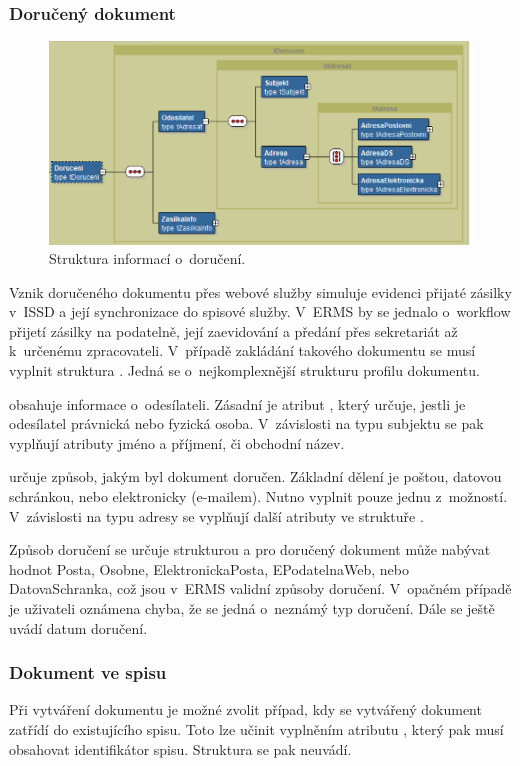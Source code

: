 \documentclass[
  master,
  field=ainfp,
  biblatex,
  language=czech,
  glossaries,
  theorems=false,
  index
]{kidiplom}
\begin{document}
\subsubsection{Doručený dokument}  
\begin{figure}[h]
  \centerline{\includegraphics[width=0.9\linewidth]{./images/Doruceni.png}} 
  \caption{Struktura informací o~doručení.} 
\end{figure}            
Vznik doručeného dokumentu přes webové služby simuluje evidenci přijaté zásilky v~ISSD a její synchronizace do spisové služby. V~ERMS by se jednalo o~workflow přijetí zásilky na podatelně, její zaevidování a předání přes sekretariát až k~určenému zpracovateli. V~případě zakládání takového dokumentu se musí vyplnit struktura . Jedná se o~nejkomplexnější strukturu profilu dokumentu.

 obsahuje informace o~odesílateli. Zásadní je atribut , který určuje, jestli je odesílatel právnická nebo fyzická osoba. V~závislosti na typu subjektu se pak vyplňují atributy jméno a příjmení, či obchodní název.

 určuje způsob, jakým byl dokument doručen. Základní dělení je poštou, datovou schránkou, nebo elektronicky (e-mailem). Nutno vyplnit pouze jednu z~možností. V~závislosti na typu adresy se vyplňují další atributy ve struktuře .

Způsob doručení se určuje strukturou  a pro doručený dokument může nabývat hodnot Posta, Osobne, ElektronickaPosta, EPodatelnaWeb, nebo DatovaSchranka, což jsou v~ERMS validní způsoby doručení. V~opačném případě je uživateli oznámena chyba, že se jedná o~neznámý typ doručení. Dále se ještě uvádí datum doručení.

\subsubsection{Dokument ve spisu}           
Při vytváření dokumentu je možné zvolit případ, kdy se vytvářený dokument zatřídí do existujícího spisu. Toto lze učinit vyplněním atributu , který pak musí obsahovat identifikátor spisu. Struktura  se pak neuvádí.
\end{document}
